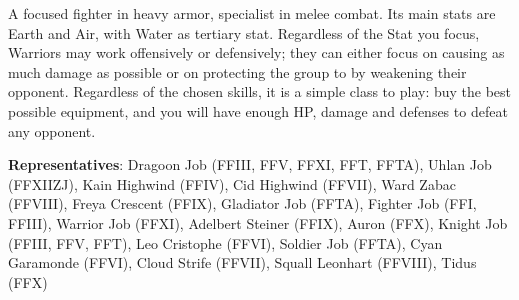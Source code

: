 \begin{jobdesc}[name=pjob-warrior]
    A focused fighter in heavy armor, specialist in melee combat. Its main stats are Earth and Air, with Water as tertiary stat. Regardless of the Stat you focus, Warriors may work offensively or defensively; they can either focus on causing as much damage as possible or on protecting the group to by weakening their opponent. Regardless of the chosen skills, it is a simple class to play: buy the best possible equipment, and you will have enough HP, damage and defenses to defeat any opponent. \pc%

    \textbf{Representatives}: Dragoon Job (FFIII, FFV, FFXI, FFT, FFTA), Uhlan Job (FFXIIZJ), Kain Highwind (FFIV), Cid Highwind (FFVII), Ward Zabac (FFVIII), Freya Crescent (FFIX), Gladiator Job (FFTA), Fighter Job (FFI, FFIII), Warrior Job (FFXI), Adelbert Steiner (FFIX), Auron (FFX), Knight Job (FFIII, FFV, FFT), Leo Cristophe (FFVI), Soldier Job (FFTA), Cyan Garamonde (FFVI), Cloud Strife (FFVII), Squall Leonhart (FFVIII), Tidus (FFX) \pc%

    \jobstats[hpa=5x,hpb=6x,hpc=7x,hpd=8x,mpa=0x,mpc=1x,armor=Heavy,weapons=Light Sword/ Knives \\ Claws / Gloves \\ Weapon \& Shield \\ Heavy Weapon \\ Katanas \\ Polearms]
\end{jobdesc}

